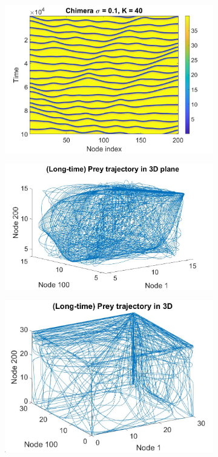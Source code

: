 \documentclass[12pt]{article}
\begin{document}
\begin{figure}[h]
\begin{subfigure}[b]{0.32\linewidth}
        \includegraphics[width=\textwidth]{Chaos Stuff/k40chim.jpg}
        \label{fig:k40traj}
    \end{subfigure}
    \hfill
    \begin{subfigure}[b]{0.32\linewidth}
        \centering
        \includegraphics[width=\textwidth]{Chaos Stuff/k20traj.jpg}
        \label{fig:k20lattice}
    \end{subfigure}
    \hfill
    \begin{subfigure}[b]{0.32\linewidth}
        \centering
        \includegraphics[width=\textwidth]{Chaos Stuff/k30traj.jpg}

\end{subfigure}
\end{figure}
\end{document}
